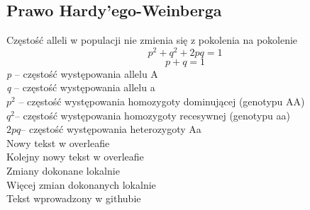 \begin{flushleft}
\subsection{Prawo Hardy’ego-Weinberga }
 Częstość alleli w populacji nie zmienia się z pokolenia na pokolenie
\[p^2 + q^2 +2pq =1\]
\[p + q = 1\]
\textit{p} – częstość występowania allelu A\\
\textit{q} – częstość występowania allelu a\\
$p^2$ – częstość występowania homozygoty dominującej (genotypu AA)\\
$q^2$– częstość występowania homozygoty recesywnej (genotypu aa)\\
$2pq$– częstość występowania heterozygoty Aa\\

Nowy tekst w overleafie\\
Kolejny nowy tekst w overleafie\\
Zmiany dokonane lokalnie\\
Więcej zmian dokonanych lokalnie\\
Tekst wprowadzony w githubie\\
\end{flushleft}
